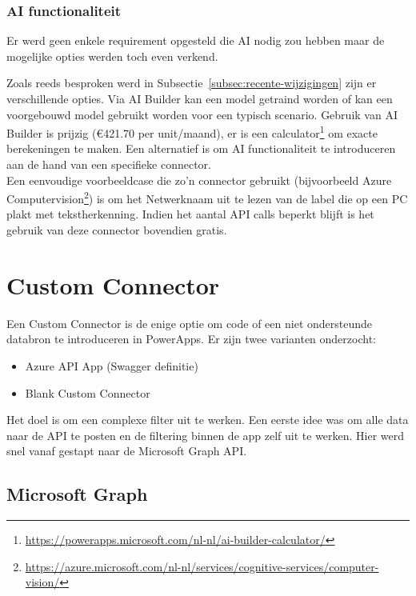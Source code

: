 \subsubsection{AI functionaliteit}

Er werd geen enkele requirement opgesteld die AI nodig zou hebben maar de mogelijke opties werden toch even verkend.

Zoals reeds besproken werd in Subsectie~\ref{subsec:recente-wijzigingen} zijn er verschillende opties. Via AI Builder kan een model getraind worden of kan een voorgebouwd model gebruikt worden voor een typisch scenario. Gebruik van AI Builder is prijzig (\euro 421.70 per unit/maand), er is een calculator\footnote{\url{https://powerapps.microsoft.com/nl-nl/ai-builder-calculator/}} om exacte berekeningen te maken. Een alternatief is om AI functionaliteit te introduceren aan de hand van een specifieke connector.\\
Een eenvoudige voorbeeldcase die zo'n connector gebruikt (bijvoorbeeld Azure Computervision\footnote{\url{https://azure.microsoft.com/nl-nl/services/cognitive-services/computer-vision/}}) is om het Netwerknaam uit te lezen van de label die op een PC plakt met tekstherkenning. Indien het aantal API calls beperkt blijft is het gebruik van deze connector bovendien gratis.

\section{Custom Connector}
\label{sec:custom-connector}

Een Custom Connector is de enige optie om code of een niet ondersteunde databron te introduceren in PowerApps. Er zijn twee varianten onderzocht:
\begin{itemize}
    \item Azure API App (Swagger definitie)
    \item Blank Custom Connector
\end{itemize}
Het doel is om een complexe filter uit te werken. Een eerste idee was om alle data naar de API te posten en de filtering binnen de app zelf uit te werken. Hier werd snel vanaf gestapt naar de Microsoft Graph API. %


\subsection{Microsoft Graph}
\label{subsec:ms-graph}

